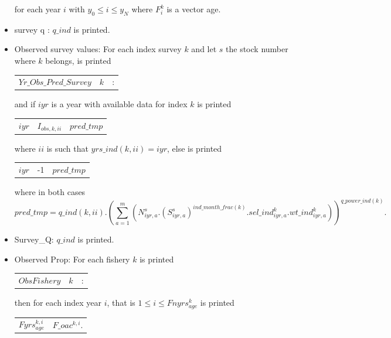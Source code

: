 \documentclass{article}
\begin{document}
\begin{itemize}
\begin{center}
\begin{tabular}{c c c }
        \end{tabular}
        for each year $i$ with $y_0\leq i \leq y_N$ where $F^k_i$ is a vector age.
    \end{center}
    \item survey q : $q\_ind$ is printed.
    \item Observed survey values: For each index survey $k$ and let $s$ the stock number where $k$ belongs, is printed
    \begin{center}
        \begin{tabular}{c c c}
        $Yr\_Obs\_Pred\_Survey $     & $k$ & :  \\
        \end{tabular}
    \end{center}

    and if $iyr$ is a year with available data for index $k$ is printed
    \begin{center}
        \begin{tabular}{c c c}
            $iyr$ & $I_{obs,k,ii}$ & $pred\_tmp$ \\
        \end{tabular}
    \end{center}
    where $ii$ is such that $yrs\_ind(k,ii)= iyr$, else is printed
    \begin{center}
        \begin{tabular}{c c c }
           $iyr$  & -1  & $pred\_tmp$\\
        \end{tabular}
    \end{center}
    where in both cases 
    \begin{equation*}
        pred\_tmp= q\_ind(k,ii) . \left(\sum_{a=1}^m\left(N^s_{iyr,a}.{(S^{s}_{iyr,a})}^{ind\_month\_frac(k)}. sel\_ind^k_{iyr,a}.  wt\_ind^k_{iyr,a}\right)\right)^{q\_power\_ind(k)}.
    \end{equation*}
    \item Survey\_Q: $q\_ind$ is printed.
    \item Observed Prop: For each fishery $k$ is printed
    \begin{center}
        \begin{tabular}{c c c}
         $ObsFishery$    &  $k $& :\\
        \end{tabular}
    \end{center}
    then for each index year $i$, that is $1\leq i \leq Fnyrs^k_{age}$ is printed
    \begin{center}
        \begin{tabular}{c c}
           $ Fyrs^{k,i}_{age}$ &  $F\_oac^{k,i}$. \\
            

\end{tabular}
\end{center}
\end{itemize}
\end{document}
